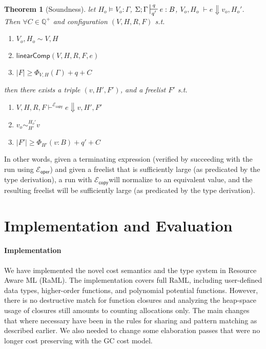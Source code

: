 \documentclass{easychair}
\newtheorem{theorem}{Theorem}
\newcommand{\ms}[1]{\ensuremath{\mathsf{#1}}}
\newcounter{rule}
\newcommand{\wfc}[5]{\mathsf{linearComp}(#1,#2,#3,#4,#5)}
\newcommand{\veq}[4]{#3 \sim^{#1}_{#2} #4}
\newcommand{\copySem}{\ensuremath{\mathcal{E}_{\ms{copy}}}}
\theoremstyle{definition}
\begin{document}
\begin{theorem}[Soundness]
let $H_o \vDash V_o : \Gamma$, $\Sigma; \Gamma \sststile{q'}{q} e : B$,
$V_o,H_o \; \vdash e \Downarrow v_o, H_o'$.
Then $\forall C \in \mathbb{Q}^{+}$ and configuration $(V,H,R,F)$ s.t.
\begin{enumerate} 
\item $V_o,H_o \sim V,H$
\item $\wfc{V}{H}{R}{F}{e}$
\item $|F| \ge \Phi_{V,H}(\Gamma) + q + C$ 
\end{enumerate}
then there exists a triple $(v,H',F')$, and a freelist $F'$ s.t.
\begin{enumerate}
  \item $V,H,R,F \vdash^{\copySem{}} e \Downarrow v, H', F'$
	\item $\veq{H_o'}{H'}{v_o}{v}$
  \item $|F'| \ge \Phi_{H'}(v:B) + q' + C$
\end{enumerate}
\end{theorem}

In other words, given a terminating expression (verified by succeeding with the run using $\mathcal{E}_{\ms{oper}}$)
and given a freelist that is sufficiently large (as predicated by the type derivation), 
a run with \copySem will normalize to an equivalent value, and the resulting freelist 
will be sufficiently large (as predicated by the type derivation).


\section{Implementation and Evaluation}
\label{sect:implementation}

\paragraph{Implementation}
We have implemented the novel cost semantics and the type system in
Resource Aware ML (RaML). The implementation covers full RaML,
including user-defined data types, higher-order functions, and
polynomial potential functions. However, there is no destructive match
for function closures and analyzing the heap-space usage of closures
still amounts to counting allocations only. The main changes that
where necessary have been in the rules for sharing and pattern
matching as described earlier. We also needed to change some
elaboration passes that were no longer cost preserving with
the GC cost model.
\end{document}
